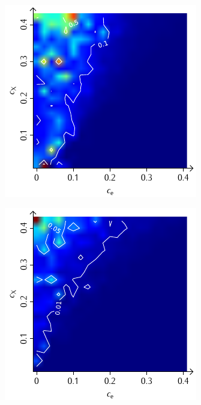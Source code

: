 \documentclass[a4paper, 10pt, twoside, openany]{book} %
\begin{document}
\begin{figure}
\begin{minipage}[t]{0.48\textwidth}
			\label{F_penalty_cluster_G}
		\end{minipage}
		\begin{minipage}[t]{0.48\textwidth}
			\includegraphics[width=\textwidth]{Abbildungen/Phasendiagramme/Konturen/F_random_G.pdf}
			\label{F_random_G}
		\end{minipage}
		\hfill
		\begin{minipage}[t]{0.48\textwidth}
			\includegraphics[width=\textwidth]{Abbildungen/Phasendiagramme/Konturen/F_penalty_random_G.pdf}

\end{minipage}
\end{figure}
\end{document}
